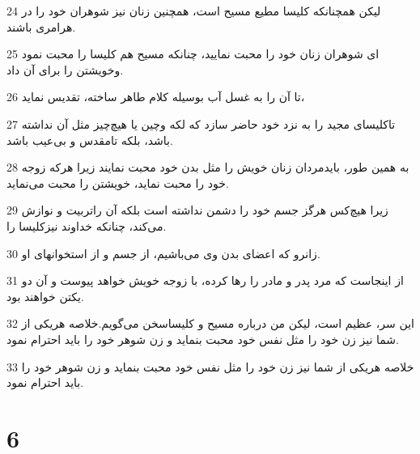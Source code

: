\par 24 لیکن همچنانکه کلیسا مطیع مسیح است، همچنین زنان نیز شوهران خود را در هرامری باشند.
\par 25 ‌ای شوهران زنان خود را محبت نمایید، چنانکه مسیح هم کلیسا را محبت نمود وخویشتن را برای آن داد.
\par 26 تا آن را به غسل آب بوسیله کلام طاهر ساخته، تقدیس نماید،
\par 27 تاکلیسای مجید را به نزد خود حاضر سازد که لکه وچین یا هیچ‌چیز مثل آن نداشته باشد، بلکه تامقدس و بی‌عیب باشد.
\par 28 به همین طور، بایدمردان زنان خویش را مثل بدن خود محبت نمایند زیرا هرکه زوجه خود را محبت نماید، خویشتن را محبت می‌نماید.
\par 29 زیرا هیچ‌کس هرگز جسم خود را دشمن نداشته است بلکه آن راتربیت و نوازش می‌کند، چنانکه خداوند نیزکلیسا را.
\par 30 زانرو که اعضای بدن وی می‌باشیم، از جسم و از استخوانهای او.
\par 31 از اینجاست که مرد پدر و مادر را رها کرده، با زوجه خویش خواهد پیوست و آن دو یکتن خواهند بود.
\par 32 این سر، عظیم است، لیکن من درباره مسیح و کلیساسخن می‌گویم.خلاصه هریکی از شما نیز زن خود را مثل نفس خود محبت بنماید و زن شوهر خود را باید احترام نمود.
\par 33 خلاصه هریکی از شما نیز زن خود را مثل نفس خود محبت بنماید و زن شوهر خود را باید احترام نمود.

\chapter{6}

